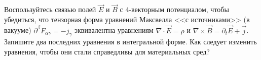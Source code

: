 \documentclass[__main__.tex]{subfiles}
\begin{document}
Воспользуйтесь связью полей $\vec{E}$ и $\vec{B}$ с 4-векторным потенциалом, чтобы убедиться, что тензорная форма уравнений Максвелла <<с источниками>> (в вакууме) $\partial^{\beta}F_{\alpha\gamma}=-j_{\gamma}$ эквивалентна уравнениям $\nabla\cdot\vec{E}=\rho$ и $\nabla\times\vec{B}=\partial_{t}\vec{E}+\vec{j}$. Запишите два последних уравнения в интегральной форме. Как следует изменить уравнения, чтобы они стали справедливы для материальных сред?\\ 

\end{document}

